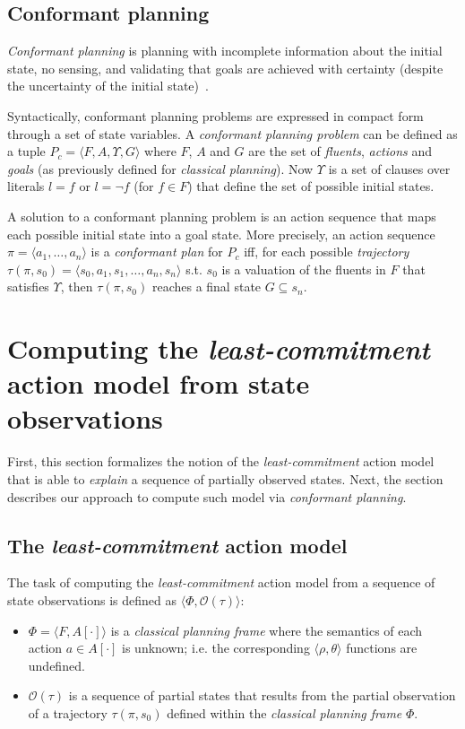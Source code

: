 \documentclass{article}
\newcommand{\tup}[1]{{\langle #1 \rangle}}
\begin{document}
\subsection{Conformant planning}
{\em Conformant planning} is planning with incomplete information about the initial state, no sensing, and validating that goals are achieved with certainty (despite the uncertainty of the initial state)~\cite{goldman1996expressive,smith1998conformant,bonet2000planning}.

Syntactically, conformant planning problems are expressed in compact form through a set of state variables. A {\em conformant planning problem} can be defined as a tuple $P_c=\tup{F,A,\Upsilon,G}$ where $F$, $A$ and $G$ are the set of {\em fluents}, {\em actions} and {\em goals} (as previously defined for {\em classical planning}). Now $\Upsilon$ is a set of clauses over literals $l=f$ or $l=\neg f$ (for $f\in F$) that define the set of possible initial states. 

A solution to a conformant planning problem is an action sequence that maps each possible initial state into a goal state. More precisely, an action sequence $\pi=\tup{a_1, \ldots, a_n}$ is a {\em conformant plan} for $P_c$ iff, for each possible {\em trajectory} $\tau(\pi,s_0)=\tup{s_0, a_1, s_1, \ldots, a_n, s_n}$ s.t. $s_0$ is a valuation of the fluents in $F$ that satisfies $\Upsilon$, then $\tau(\pi,s_0)$ reaches a final state $G \subseteq s_n$.



\section{Computing the {\em least-commitment} action model from state observations}
First, this section formalizes the notion of the {\em least-commitment} action model that is able to {\em explain} a sequence of partially observed states. Next, the section describes our approach to compute such model via {\em conformant planning}. 

\subsection{The {\em least-commitment} action model}
The task of computing the {\em least-commitment} action model from a sequence of state observations is defined as $\tup{\Phi,\mathcal{O}(\tau)}$:
\begin{itemize}
\item $\Phi=\tup{F,A[\cdot]}$ is a {\em classical planning frame} where the semantics of each action $a\in A[\cdot]$ is unknown; i.e. the corresponding $\tup{\rho,\theta}$ functions are undefined. 
\item $\mathcal{O}(\tau)$ is a sequence of partial states that results from the partial observation of a trajectory $\tau(\pi,s_0)$ defined within the {\em classical planning frame} $\Phi$.
\end{itemize}
\end{document}
